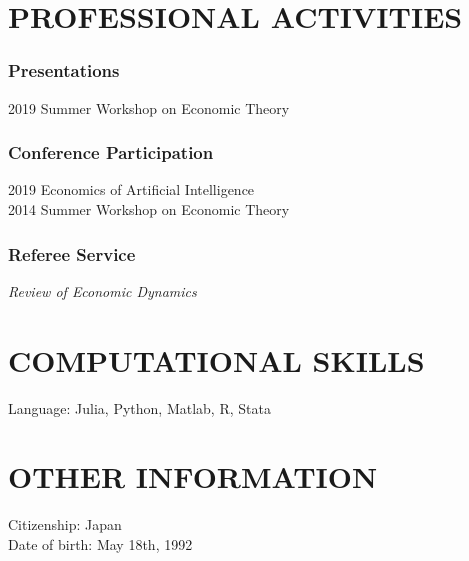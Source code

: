 \documentclass[12pt]{article}
\begin{document}
\section*{PROFESSIONAL ACTIVITIES}
\subsubsection*{Presentations}
2019 Summer Workshop on Economic Theory
\subsubsection*{Conference Participation}
2019 Economics of Artificial Intelligence\\
2014 Summer Workshop on Economic Theory
\subsubsection*{Referee Service}
\textit{Review of Economic Dynamics}

\section*{COMPUTATIONAL SKILLS}
Language: Julia, Python, Matlab, R, Stata

\section*{OTHER INFORMATION}
Citizenship: Japan\\
Date of birth: May 18th, 1992
\end{document}
